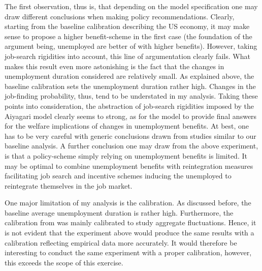 \documentclass[a4paper,12pt]{article}
\begin{document}
The first observation, thus is, that depending on the model specification one may draw different conclusions when making policy recommendations. Clearly, starting from the baseline calibration describing the US economy, it may make sense to propose a higher benefit-scheme in the first case (the foundation of the argument being, unemployed are better of with higher benefits). However, taking job-search rigidities into account, this line of argumentation clearly fails. What makes this result even more astonishing is the fact that the changes in unemployment duration considered are relatively small. As explained above, the baseline calibration sets the unemployment duration rather high. Changes in the job-finding probability, thus, tend to be understated in my analysis. Taking these points into consideration, the abstraction of job-search rigidities imposed by the Aiyagari model clearly seems to strong, as for the model to provide final answers for the welfare implications of changes in unemployment benefits. At best, one has to be very careful with generic conclusions drawn from studies similar to our baseline analysis. 
A further conclusion one may draw from the above experiment, is that a policy-scheme simply relying on unemployment benefits is limited. It may be optimal to combine unemployment benefits with reintegration measures facilitating job search and incentive schemes inducing the unemployed to reintegrate themselves in the job market.

One major limitation of my analysis is the calibration. As discussed before, the baseline average unemployment duration is rather high. Furthermore, the calibration from \cite{DenHaan20101} was mainly calibrated to study aggregate fluctuations. Hence, it is not evident that the experiment above would produce the same results with a calibration reflecting empirical data more accurately. It would therefore be interesting to conduct the same experiment with a proper calibration, however, this exceeds the scope of this exercise. 




\newpage




\end{document}
